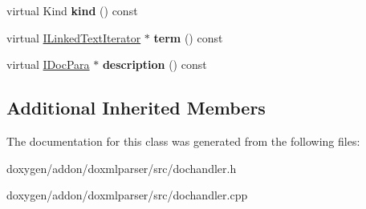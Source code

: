 \begin{DoxyCompactItemize}
\item 
\mbox{\label{class_variable_list_entry_handler_ad38a1ca4cc09e1f5486a4a8959f9af2d}} 
virtual Kind {\bfseries kind} () const
\item 
\mbox{\label{class_variable_list_entry_handler_ab930d65bc9cefac24cfff84088e3a7bc}} 
virtual \mbox{\hyperlink{class_i_linked_text_iterator}{I\+Linked\+Text\+Iterator}} $\ast$ {\bfseries term} () const
\item 
\mbox{\label{class_variable_list_entry_handler_aaf6ba187c11efda9c536a084bb0981cb}} 
virtual \mbox{\hyperlink{class_i_doc_para}{I\+Doc\+Para}} $\ast$ {\bfseries description} () const
\end{DoxyCompactItemize}
\subsection*{Additional Inherited Members}


The documentation for this class was generated from the following files\+:\begin{DoxyCompactItemize}
\item 
doxygen/addon/doxmlparser/src/dochandler.\+h\item 
doxygen/addon/doxmlparser/src/dochandler.\+cpp\end{DoxyCompactItemize}
